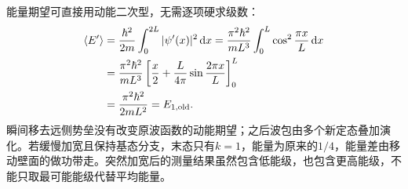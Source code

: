 \begin{solution}
能量期望可直接用动能二次型，无需逐项硬求级数：
\begin{align*}
 \langle E'\rangle&=\frac{\hbar^2}{2m}\int_0^{2L}|\psi'(x)|^2\mathop{}\!\mathrm d x
 =\frac{\pi^2\hbar^2}{mL^3}\int_0^L\cos^2\frac{\pi x}{L}\mathop{}\!\mathrm d x\\
 &=\frac{\pi^2\hbar^2}{mL^3}
 \left[\frac x2+\frac{L}{4\pi}\sin\frac{2\pi x}{L}\right]_0^L\\
 &=\frac{\pi^2\hbar^2}{2mL^2}=E_{1,\rm old}.
\end{align*}
瞬间移去远侧势垒没有改变原波函数的动能期望；之后波包由多个新定态叠加演化。若缓慢加宽且保持基态分支，末态只有$k=1$，能量为原来的$1/4$，能量差由移动壁面的做功带走。突然加宽后的测量结果虽然包含低能级，也包含更高能级，不能只取最可能能级代替平均能量。
\end{solution}
